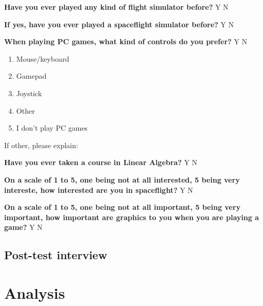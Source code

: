 \vspace{5mm}
\noindent\textbf{Have you ever played any kind of flight simulator before?} Y N

\vspace{5mm}
\noindent\textbf{If yes, have you ever played a spaceflight simulator before?} Y N

\vspace{5mm}
\noindent\textbf{When playing PC games, what kind of controls do you prefer?} Y N
\begin{enumerate}
  \item Mouse/keyboard
  \item Gamepad
  \item Joystick
  \item Other
  \item I don’t play PC games
\end{enumerate}
If other, please explain:

\vspace{5mm}
\noindent\textbf{Have you ever taken a course in Linear Algebra?} Y N

\vspace{5mm}
\noindent\textbf{On a scale of 1 to 5, one being not at all interested, 5 being very intereste, how interested are you in spaceflight?} Y N

\vspace{5mm}
\noindent\textbf{On a scale of 1 to 5, one being not at all important, 5 being very important, how important are graphics to you when you are playing a game?} Y N

\subsection{Post-test interview}

\section{Analysis}




